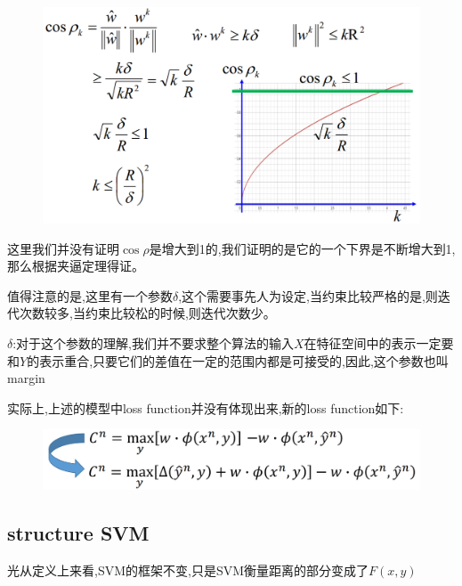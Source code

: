 \documentclass[UTF8,a4paper]{ctexart}
\begin{document}
        \begin{figure}[H]
            \centering
            \includegraphics[scale = 0.3]{assets/ML_78f61.png}
        \end{figure}

        {\color{blue}
        这里我们并没有证明$\cos \rho$是增大到1的,我们证明的是它的一个下界是不断增大到1,那么根据夹逼定理得证。

        值得注意的是,这里有一个参数$\delta$,这个需要事先人为设定,当约束比较严格的是,则迭代次数较多,当约束比较松的时候,则迭代次数少。

        $\delta$:对于这个参数的理解,我们并不要求整个算法的输入$X$在特征空间中的表示一定要和$Y$的表示重合,只要它们的差值在一定的范围内都是可接受的,因此,这个参数也叫margin
        }

        实际上,上述的模型中loss function并没有体现出来,新的loss function如下:
        \begin{figure}[H]
            \centering
            \includegraphics[scale = 0.3]{assets/ML_56817.png}
        \end{figure}

        \subsection{structure SVM}
        {\color{blue}光从定义上来看,SVM的框架不变,只是SVM衡量距离的部分变成了$F(x,y)$}
\end{document}
